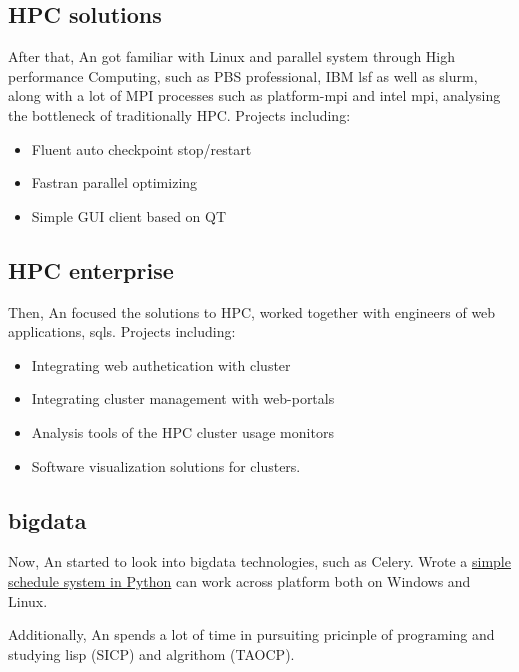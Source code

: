 \documentclass[letterpaper]{twentysecondcv} %
\begin{document}
\subsection{{\small HPC solutions}}
After that, An got familiar with Linux and parallel system through High performance Computing, such as PBS professional, IBM lsf as well as slurm, along with a lot of MPI processes such as platform-mpi and intel mpi, analysing the bottleneck of traditionally HPC. 
Projects including:

  \begin{itemize}
  \item Fluent auto checkpoint  stop/restart
  \item Fastran parallel optimizing
  \item Simple GUI client based on QT
  \end{itemize}

\subsection{{\small HPC enterprise}}
Then, An focused the solutions to HPC, worked together with engineers of web applications, sqls. 
Projects including:
{\small
  \begin{itemize}
  \item Integrating web authetication with cluster 
  \item Integrating cluster management with web-portals
  \item Analysis tools of the HPC cluster usage monitors
  \item Software visualization solutions for clusters.
  \end{itemize}
}

\subsection{{\small bigdata}}

Now, An started to look into bigdata technologies, such as Celery.
Wrote a \href{https://github.com/sourceonly/program/tree/gh-pages/program/python/py-batch-system}{simple schedule system in Python} can work across platform both on Windows and Linux. 

Additionally, An spends a lot of time in pursuiting pricinple of programing and studying lisp (SICP) and algrithom (TAOCP).
\end{document}
